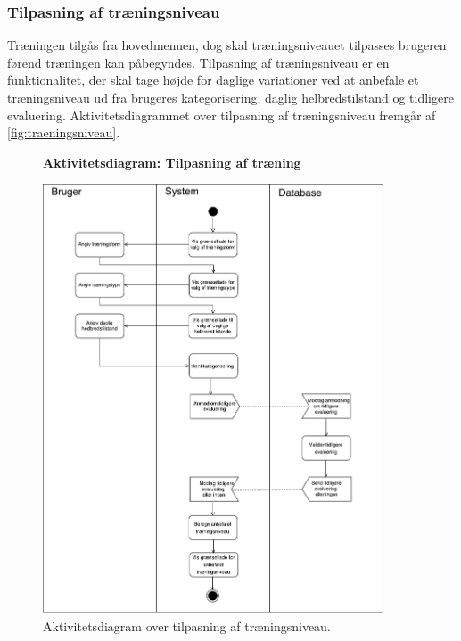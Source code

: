 \subsubsection*{Tilpasning af træningsniveau} \label{sec:traeningsniveau}
Træningen tilgås fra hovedmenuen, dog skal træningsniveauet tilpasses brugeren førend træningen kan påbegyndes. Tilpasning af træningsniveau er en funktionalitet, der skal tage højde for daglige variationer ved at anbefale et træningsniveau ud fra brugeres kategorisering, daglig helbredstilstand og tidligere evaluering.  
Aktivitetsdiagrammet over tilpasning af træningsniveau fremgår af \autoref{fig:traeningsniveau}.

\begin{figure} [H]
\centering
\textbf{Aktivitetsdiagram: Tilpasning af træning}\par\medskip
\includegraphics[width=0.9\textwidth]{figures/aktivitetsdiagram/Tilpasningaftraeningsniveau}
\caption{Aktivitetsdiagram over tilpasning af træningsniveau.}
\label{fig:traeningsniveau}
\end{figure}

